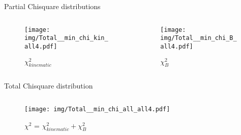 \documentclass{beamer}
\begin{document}
\begin{frame}{Partial Chisquare distributions}
  \begin{columns}
    \begin{column}{0.45\textwidth}\begin{figure}
      \caption{$\chi^2_{kinematic}$}
      \texttt{[image: img/Total\_\_min\_chi\_kin\_all4.pdf]}
    \end{figure}\end{column}
    \begin{column}{0.45\textwidth}\begin{figure}
      \caption{$\chi^2_{B}$}
      \texttt{[image: img/Total\_\_min\_chi\_B\_all4.pdf]}
    \end{figure}\end{column}
  \end{columns}
\end{frame}

\begin{frame}{Total Chisquare distribution}
  \begin{columns}
    \begin{column}{0.45\textwidth}\begin{figure}
      \caption{$\chi^2$ = $\chi^2_{kinematic} + \chi^2_{B}$}
      \texttt{[image: img/Total\_\_min\_chi\_all\_all4.pdf]}
    \end{figure}\end{column}
  \end{columns}
\end{frame}
\end{document}
